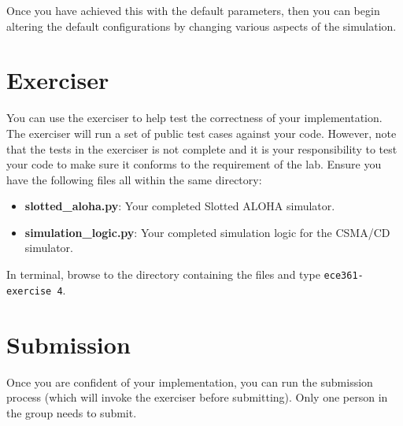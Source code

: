 \documentclass[11pt]{article}
\def\thelab{4}
\begin{document}
Once you have achieved this with the default parameters, then you can begin altering the default configurations by changing various aspects of the simulation.



\section{Exerciser}
\label{sec:exercise}
You can use the exerciser to help test the correctness of your implementation.
The exerciser will run a set of public test cases against your code.
However, note that the tests in the exerciser is not complete and it is your responsibility to test your code to make sure it conforms to the requirement of the lab.
Ensure you have the following files all within the same directory:
\begin{itemize}
    \item \textbf{slotted\_aloha.py}: Your completed Slotted ALOHA simulator.
    \item \textbf{simulation\_logic.py}: Your completed simulation logic for the CSMA/CD simulator.
\end{itemize}

In terminal, browse to the directory containing the files and type \texttt{ece361-exercise \thelab}.

\section{Submission}
\label{sec:submission}
Once you are confident of your implementation, you can run the submission process (which will invoke the exerciser before submitting).
Only one person in the group needs to submit.
\end{document}
